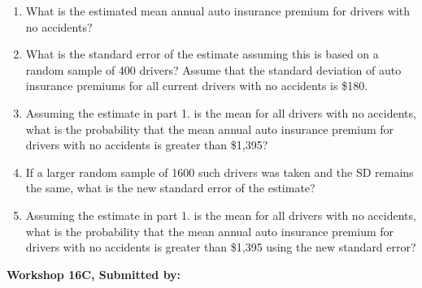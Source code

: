 \documentclass[11pt, chapterprefix=true]{scrbook}\usepackage[]{graphicx}\usepackage[]{color}
\begin{document}
\begin{exercises}
\begin{exercise}
\begin{minipage}[ht]{7cm}
\end{minipage}

\begin{enumerate}
\item  What is the estimated mean annual auto insurance premium for drivers with no accidents?
\item  What is the standard error of the estimate assuming this is based on a random sample of 400 drivers? Assume that the standard deviation of auto insurance premiums for all current drivers with no accidents is \$180.
\item  Assuming the estimate in part 1. is the mean for all drivers with no accidents, what is the probability that the mean annual auto insurance premium for drivers with no accidents is greater than \$1,395?
\item  If a larger random sample of 1600 such drivers was taken and the SD remains the same, what is the new standard error of the estimate?
\item  Assuming the estimate in part 1. is the mean for all drivers with no accidents, what is the probability that the mean annual auto insurance premium for drivers with no accidents is greater than \$1,395 using the new standard error?
\end{enumerate}

\end{exercise}
\begin{solution}  %

\end{solution}

\clearpage

    \begin{exercise}  %

    \begin{center}
\begin{flushleft}\textbf{\large \hfill Workshop 16C, Submitted by: }\end{flushleft}

\end{center}
\end{exercise}
\end{exercises}
\end{document}
